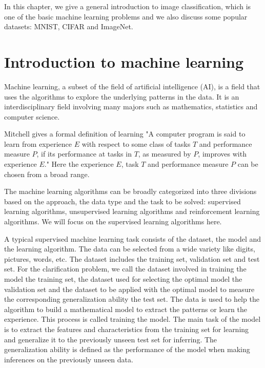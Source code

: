 \documentclass[
]{article}
\author{}
\date{}
\begin{document}
In this chapter, we give a general introduction to image classification,
which is one of the basic machine learning problems and we also discuss
some popular datasets: MNIST, CIFAR and ImageNet.

\hypertarget{introduction-to-machine-learning}{%
\section{Introduction to machine
learning}\label{introduction-to-machine-learning}}

Machine learning, a subset of the field of artificial intelligence (AI),
is a field that uses the algorithms to explore the underlying patterns
in the data. It is an interdisciplinary field involving many majors such
as mathematics, statistics and computer science.

Mitchell \cite{mitchell1997machine} gives a formal definition of
learning "A computer program is said to learn from experience \(E\) with
respect to some class of tasks \(T\) and performance measure \(P\), if
its performance at tasks in \(T\), as measured by \(P\), improves with
experience \(E\)." Here the experience \(E\), task \(T\) and performance
measure \(P\) can be chosen from a broad range.

The machine learning algorithms can be broadly categorized into three
divisions based on the approach, the data type and the task to be
solved: supervised learning algorithms, unsupervised learning algorithms
and reinforcement learning algorithms. We will focus on the supervised
learning algorithms here.

A typical supervised machine learning task consists of the dataset, the
model and the learning algorithm. The data can be selected from a wide
variety like digits, pictures, words, etc. The dataset includes the
training set, validation set and test set. For the clarification
problem, we call the dataset involved in training the model the training
set, the dataset used for selecting the optimal model the validation set
and the dataset to be applied with the optimal model to measure the
corresponding generalization ability the test set. The data is used to
help the algorithm to build a mathematical model to extract the patterns
or learn the experience. This process is called training the model. The
main task of the model is to extract the features and characteristics
from the training set for learning and generalize it to the previously
unseen test set for inferring. The generalization ability is defined as
the performance of the model when making inferences on the previously
unseen data.
\end{document}
